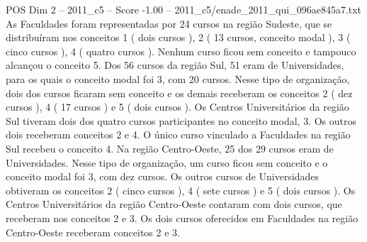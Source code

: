 \begin{textsample}{POS Dim 2 – 2011\_c5 – Score -1.00 – 2011\_c5/enade\_2011\_qui\_096ae845a7.txt}
As Faculdades foram representadas por 24 cursos na região Sudeste, que se distribuíram nos conceitos 1 ( dois cursos ), 2 ( 13 cursos, conceito modal ), 3 ( cinco cursos ), 4 ( quatro cursos ).
Nenhum curso ficou sem conceito e tampouco alcançou o conceito 5.
Dos 56 cursos da região Sul, 51 eram de Universidades, para os quais o conceito modal foi 3, com 20 cursos.
Nesse tipo de organização, dois dos cursos ficaram sem conceito e os demais receberam os conceitos 2 ( dez cursos ), 4 ( 17 cursos ) e 5 ( dois cursos ).
Os Centros Universitários da região Sul tiveram dois dos quatro cursos participantes no conceito modal, 3.
Os outros dois receberam conceitos 2 e 4.
O único curso vinculado a Faculdades na região Sul recebeu o conceito 4.
Na região Centro-Oeste, 25 dos 29 cursos eram de Universidades.
Nesse tipo de organização, um curso ficou sem conceito e o conceito modal foi 3, com dez cursos.
Os outros cursos de Universidades obtiveram os conceitos 2 ( cinco cursos ), 4 ( sete cursos ) e 5 ( dois cursos ).
Os Centros Universitários da região Centro-Oeste contaram com dois cursos, que receberam nos conceitos 2 e 3.
Os dois cursos oferecidos em Faculdades na região Centro-Oeste receberam conceitos 2 e 3.

\end{textsample}
